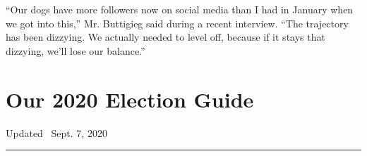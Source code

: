 ``Our dogs have more followers now on social media than I had in January
when we got into this,'' Mr. Buttigieg said during a recent interview.
``The trajectory has been dizzying. We actually needed to level off,
because if it stays that dizzying, we'll lose our balance.''

\hypertarget{our-2020-election-guide}{%
\section{Our 2020 Election Guide}\label{our-2020-election-guide}}

Updated ~Sept. 7, 2020

\begin{center}\rule{0.5\linewidth}{\linethickness}\end{center}

